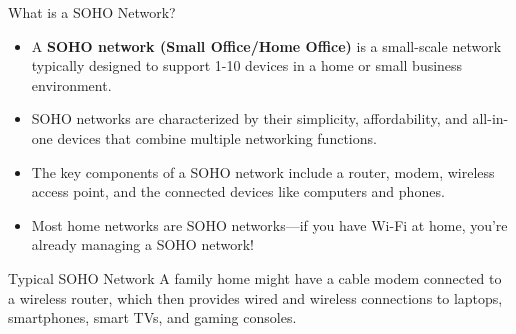 \documentclass[aspectratio=169]{beamer}
\begin{document}
\begin{frame}{What is a SOHO Network?}

\begin{itemize}
    \item A \textbf{SOHO network (Small Office/Home Office)} is a small-scale network typically designed to support 1-10 devices in a home or small business environment.
    \item SOHO networks are characterized by their simplicity, affordability, and all-in-one devices that combine multiple networking functions.
    \item The key components of a SOHO network include a router, modem, wireless access point, and the connected devices like computers and phones.
    \item Most home networks are SOHO networks—if you have Wi-Fi at home, you're already managing a SOHO network!
\end{itemize}

\vspace{0.3cm}

\begin{block}{Typical SOHO Network}
A family home might have a cable modem connected to a wireless router, which then provides wired and wireless connections to laptops, smartphones, smart TVs, and gaming consoles.
\end{block}

\end{frame}
\end{document}
